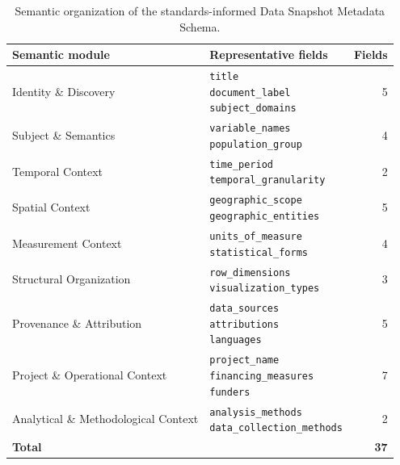 \documentclass{article}
\begin{document}
\begin{table}[!ht]
    \centering
    \caption{Semantic organization of the standards-informed Data Snapshot Metadata Schema.}
    \label{tab:schema}
    \small
    \begin{tabular}{llr}
        \toprule
        \textbf{Semantic module} & \textbf{Representative fields} & \textbf{Fields} \\
        \midrule
        Identity \& Discovery & \makecell[l]{\texttt{title} \\ \texttt{document\_label} \\ \texttt{subject\_domains}} & 5 \\
        \midrule
        Subject \& Semantics & \makecell[l]{\texttt{variable\_names} \\ \texttt{population\_group}} & 4 \\
        \midrule
        Temporal Context & \makecell[l]{\texttt{time\_period} \\ \texttt{temporal\_granularity}} & 2 \\
        \midrule
        Spatial Context & \makecell[l]{\texttt{geographic\_scope} \\ \texttt{geographic\_entities}} & 5 \\
        \midrule
        Measurement Context & \makecell[l]{\texttt{units\_of\_measure} \\ \texttt{statistical\_forms}} & 4 \\
        \midrule
        Structural Organization & \makecell[l]{\texttt{row\_dimensions} \\ \texttt{visualization\_types}} & 3 \\
        \midrule
        Provenance \& Attribution & \makecell[l]{\texttt{data\_sources} \\ \texttt{attributions} \\ \texttt{languages}} & 5 \\
        \midrule
        Project \& Operational Context & \makecell[l]{\texttt{project\_name} \\ \texttt{financing\_measures} \\ \texttt{funders}} & 7 \\
        \midrule
        Analytical \& Methodological Context & \makecell[l]{\texttt{analysis\_methods} \\ \texttt{data\_collection\_methods}} & 2 \\
        \midrule
        \textbf{Total} & & \textbf{37} \\
        \bottomrule
    \end{tabular}
\end{table}
\end{document}
